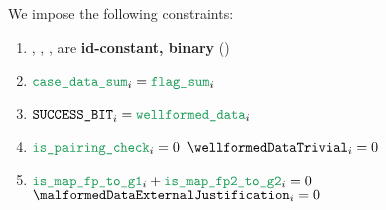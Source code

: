 We impose the following constraints:
\begin{enumerate}
    \item \malformedDataInternalJustification{}, \malformedDataExternalJustification{}, \wellformedDataTrivial{}, \wellformedDataNonTrivial{}  are \textbf{id-constant, binary} \quad (\trash)
    \item $\locCaseDataSum _{i} = \locFlagSum        _{i}$
    \item $\blsSuccessBit  _{i} = \locWellformedData _{i}$
    \item \If $\locIsBlsPairingCheck _{i} = 0$ \Then $\wellformedDataTrivial _{i} = 0$
    \item \If $\locIsBlsMapFpToGOne _{i} + \locIsBlsMapFpTwoToGTwo _{i} = 0$ \Then $\malformedDataExternalJustification _{i} = 0$
\end{enumerate}
